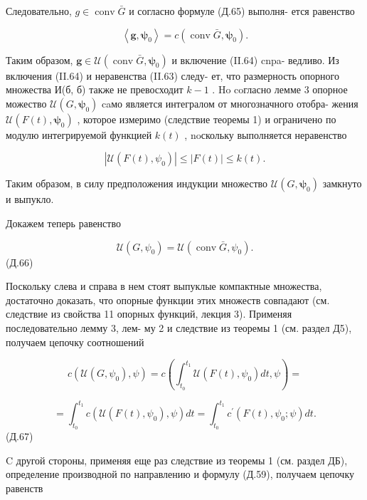 \documentclass[8pt]{extarticle}
\begin{document}
Следовательно, \(g \in  \operatorname{conv}\bar{G}\) и согласно формуле (Д.65) выполня- ется равенство

\[
\left\langle  {\mathbf{g},{\mathbf{\psi }}_{0}}\right\rangle   = c\left( {\operatorname{conv}\bar{G},{\mathbf{\psi }}_{0}}\right) .
\]

Таким образом, \(\mathbf{g} \in  \mathcal{U}\left( {\operatorname{conv}\bar{G},{\mathbf{\psi }}_{0}}\right)\) и включение (II.64) cnpa- ведливо. Из включения (II.64) и неравенства (II.63) следу- ет, что размерность опорного множества И(б, б) также не превосходит \(k - 1\) . Ho coгласно лемме 3 опорное можество \(\mathcal{U}\left( {G,{\mathbf{\psi }}_{0}}\right)\) caмо является интегралом от многозначного отобра- жения \(\mathcal{U}\left( {F\left( t\right) ,{\mathbf{\psi }}_{0}}\right)\) , которое измеримо (следствие теоремы 1) и ограничено по модулю интегрируемой функцией \(k\left( t\right)\) , noскольку выполняется неравенство

\[
\left| {\mathcal{U}\left( {F\left( t\right) ,{\psi }_{0}}\right) }\right|  \leq  \left| {F\left( t\right) }\right|  \leq  k\left( t\right) .
\]

Таким образом, в силу предположения индукции множество \(\mathcal{U}\left( {G,{\mathbf{\psi }}_{0}}\right)\) замкнуто и выпукло.

Докажем теперь равенство

\[
\mathcal{U}\left( {G,{\psi }_{0}}\right)  = \mathcal{U}\left( {\operatorname{conv}\bar{G},{\psi }_{0}}\right) .
\]
 (Д.66)

Поскольку слева и справа в нем стоят выпуклые компактные множества, достаточно доказать, что опорные функции этих множеств совпадают (см. следствие из свойства 11 опорных функций, лекция 3). Применяя последовательно лемму 3, лем- му 2 и следствие из теоремы 1 (см. раздел Д5), получаем цепочку соотношений

\[
c\left( {\mathcal{U}\left( {G,{\psi }_{0}}\right) ,\psi }\right)  = c\left( {{\int }_{{t}_{0}}^{{t}_{1}}\mathcal{U}\left( {F\left( t\right) ,{\psi }_{0}}\right) {dt},\psi }\right)  =
\]

\[
= {\int }_{{t}_{0}}^{{t}_{1}}c\left( {\mathcal{U}\left( {F\left( t\right) ,{\psi }_{0}}\right) ,\psi }\right) {dt} = {\int }_{{t}_{0}}^{{t}_{1}}{c}^{\prime }\left( {F\left( t\right) ,{\psi }_{0};\psi }\right) {dt}.
\]
 (Д.67)

C другой стороны, применяя еще раз следствие из теоремы 1 (см. раздел ДБ), определение производной по направлению и формулу (Д.59), получаем цепочку равенств
\end{document}
